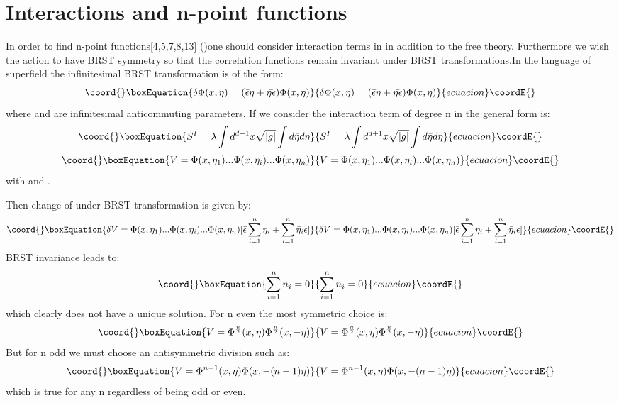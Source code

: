 \documentclass[a4paper,12pt]{article}
\begin{document}
  \section{Interactions and n-point functions}
 In order to find n-point functions[4,5,7,8,13] (\coordHE{})one should consider
 interaction terms in \coordHE{} in addition to the free
 theory. Furthermore we wish the action to have BRST symmetry so that
 the correlation functions remain invariant under BRST
 transformations.In the language of superfield the
 infinitesimal BRST transformation is of the form:
 \begin{equation}\coord{}\boxEquation{\label{eq:a12}
 \delta\Phi(x,\eta)=(\bar{\epsilon}\eta+\bar{\eta\epsilon})\Phi(x,\eta)
 }{\delta\Phi(x,\eta)=(\bar{\epsilon}\eta+\bar{\eta\epsilon})\Phi(x,\eta)
 }{ecuacion}\coordE{}\end{equation}
 where \myHighlight{$\bar{\epsilon}$}\coordHE{} and \myHighlight{$\epsilon$}\coordHE{} are infinitesimal anticommuting
 parameters.
 If we consider the interaction term of degree n in
 \coordHE{}the general form is:
\begin{equation}\coord{}\boxEquation{
S^{I}=\lambda\int d^{d+1}x\sqrt{|g|}\int d\bar{\eta}d\eta
}{
S^{I}=\lambda\int d^{d+1}x\sqrt{|g|}\int d\bar{\eta}d\eta
}{ecuacion}\coordE{}\end{equation}
\begin{equation}\coord{}\boxEquation{
V=\Phi(x,\eta_{1})...\Phi(x,\eta_{i})...\Phi(x,\eta_{n})
}{
V=\Phi(x,\eta_{1})...\Phi(x,\eta_{i})...\Phi(x,\eta_{n})
}{ecuacion}\coordE{}\end{equation}
with \coordHE{} and \coordHE{}.

 Then change of \coordHE{} under BRST transformation is given by:
  \begin{equation}\coord{}\boxEquation{
 \delta V =\Phi(x,\eta_{1})...\Phi(x,\eta_{i})...\Phi(x,\eta_{n})[\bar{\epsilon}\sum_{i=1}^{n}\eta_{i}+\sum_{i=1}^{n}\bar{\eta}_{i}\epsilon]
 }{
 \delta V =\Phi(x,\eta_{1})...\Phi(x,\eta_{i})...\Phi(x,\eta_{n})[\bar{\epsilon}\sum_{i=1}^{n}\eta_{i}+\sum_{i=1}^{n}\bar{\eta}_{i}\epsilon]
 }{ecuacion}\coordE{}\end{equation}
 BRST invariance leads to:
 \begin{equation}\coord{}\boxEquation{
 \sum_{i=1}^{n}n_{i}=0
 }{
 \sum_{i=1}^{n}n_{i}=0
 }{ecuacion}\coordE{}\end{equation}
 which clearly does not have a unique solution.
 For n even the most symmetric choice is:
 \begin{equation}\coord{}\boxEquation{\label{eq:a18}
  V=\Phi^\frac{n}{2}(x,\eta)\Phi^\frac{n}{2}(x,-\eta)
  }{V=\Phi^\frac{n}{2}(x,\eta)\Phi^\frac{n}{2}(x,-\eta)
  }{ecuacion}\coordE{}\end{equation}
 But for n odd we must choose an antisymmetric division such as:
\begin{equation}\coord{}\boxEquation{
V=\Phi^{n-1}(x,\eta)\Phi(x,-(n-1)\eta)\label{eq:a19}
}{
V=\Phi^{n-1}(x,\eta)\Phi(x,-(n-1)\eta)}{ecuacion}\coordE{}\end{equation} which is
true for any n regardless of being odd or even.
\end{document}

